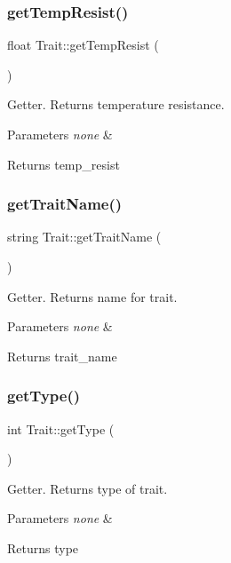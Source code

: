 \subsubsection{\texorpdfstring{get\+Temp\+Resist()}{getTempResist()}}
{\footnotesize\ttfamily float Trait\+::get\+Temp\+Resist (\begin{DoxyParamCaption}{ }\end{DoxyParamCaption})}

Getter. Returns temperature resistance. 
\begin{DoxyParams}{Parameters}
{\em none} & \\
\hline
\end{DoxyParams}
\begin{DoxyReturn}{Returns}
temp\+\_\+resist 
\end{DoxyReturn}
\mbox{\label{class_trait_a4e4fa9d379a0e7f36f1d1577ebd487a0}} 
\subsubsection{\texorpdfstring{get\+Trait\+Name()}{getTraitName()}}
{\footnotesize\ttfamily string Trait\+::get\+Trait\+Name (\begin{DoxyParamCaption}{ }\end{DoxyParamCaption})}

Getter. Returns name for trait. 
\begin{DoxyParams}{Parameters}
{\em none} & \\
\hline
\end{DoxyParams}
\begin{DoxyReturn}{Returns}
trait\+\_\+name 
\end{DoxyReturn}
\mbox{\label{class_trait_a285974c25162993ff108a762b1e5472c}} 
\subsubsection{\texorpdfstring{get\+Type()}{getType()}}
{\footnotesize\ttfamily int Trait\+::get\+Type (\begin{DoxyParamCaption}{ }\end{DoxyParamCaption})}

Getter. Returns type of trait. 
\begin{DoxyParams}{Parameters}
{\em none} & \\
\hline
\end{DoxyParams}
\begin{DoxyReturn}{Returns}
type 
\end{DoxyReturn}
\mbox{\label{class_trait_a169f7d0c6ccb29e5d385c33cc8a87e52}} 
